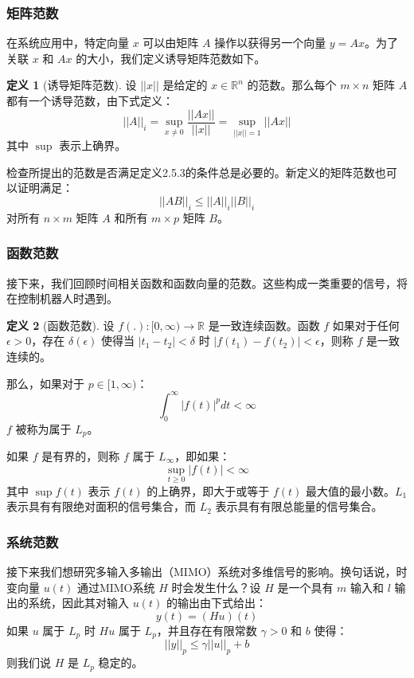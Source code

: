 \documentclass[UTF8,12pt,a4paper]{ctexart}
\theoremstyle{definition}
\newtheorem{definition}{定义}[section]
\begin{document}
\subsubsection{矩阵范数}

在系统应用中，特定向量 $x$ 可以由矩阵 $A$ 操作以获得另一个向量 $y=Ax$。为了关联 $x$ 和 $Ax$ 的大小，我们定义诱导矩阵范数如下。

\begin{definition}[诱导矩阵范数]
设 $||x||$ 是给定的 $x \in \mathbb{R}^n$ 的范数。那么每个 $m \times n$ 矩阵 $A$ 都有一个诱导范数，由下式定义：
\[
||A||_i = \sup_{x \neq 0} \frac{||Ax||}{||x||} = \sup_{||x||=1} ||Ax||
\]
其中 $\sup$ 表示上确界。
\end{definition}

检查所提出的范数是否满足定义2.5.3的条件总是必要的。新定义的矩阵范数也可以证明满足：
\[
||AB||_i \leq ||A||_i ||B||_i
\]
对所有 $n \times m$ 矩阵 $A$ 和所有 $m \times p$ 矩阵 $B$。

\subsubsection{函数范数}

接下来，我们回顾时间相关函数和函数向量的范数。这些构成一类重要的信号，将在控制机器人时遇到。

\begin{definition}[函数范数]
设 $f(.): [0, \infty) \rightarrow \mathbb{R}$ 是一致连续函数。函数 $f$ 如果对于任何 $\epsilon > 0$，存在 $\delta(\epsilon)$ 使得当 $|t_1-t_2|<\delta$ 时 $|f(t_1)-f(t_2)|<\epsilon$，则称 $f$ 是一致连续的。

那么，如果对于 $p \in [1, \infty)$：
\[
\int_0^{\infty} |f(t)|^p dt < \infty
\]
$f$ 被称为属于 $L_p$。

如果 $f$ 是有界的，则称 $f$ 属于 $L_\infty$，即如果：
\[
\sup_{t \geq 0} |f(t)| < \infty
\]
其中 $\sup f(t)$ 表示 $f(t)$ 的上确界，即大于或等于 $f(t)$ 最大值的最小数。$L_1$ 表示具有有限绝对面积的信号集合，而 $L_2$ 表示具有有限总能量的信号集合。
\end{definition}

\subsubsection{系统范数}

接下来我们想研究多输入多输出（MIMO）系统对多维信号的影响。换句话说，时变向量 $u(t)$ 通过MIMO系统 $H$ 时会发生什么？设 $H$ 是一个具有 $m$ 输入和 $l$ 输出的系统，因此其对输入 $u(t)$ 的输出由下式给出：
\[
y(t) = (Hu)(t)
\]
如果 $u$ 属于 $L_p$ 时 $Hu$ 属于 $L_p$，并且存在有限常数 $\gamma > 0$ 和 $b$ 使得：
\[
||y||_p \leq \gamma ||u||_p + b
\]
则我们说 $H$ 是 $L_p$ 稳定的。
\end{document}
